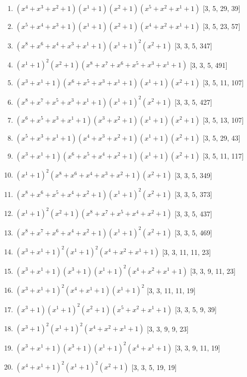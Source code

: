 \documentclass[10pt,twocolumn]{article}
\begin{document}
\begin{enumerate}
\item $(x^{4} + x^{3} + x^{2} + 1)(x^{1} + 1)(x^{2} + 1)(x^{5} + x^{2} + x^{1} + 1)$  [3, 5, 29, 39]
\item $(x^{5} + x^{4} + x^{3} + 1)(x^{1} + 1)(x^{2} + 1)(x^{4} + x^{2} + x^{1} + 1)$  [3, 5, 23, 57]
\item $(x^{8} + x^{6} + x^{4} + x^{3} + x^{1} + 1)(x^{1} + 1)^{2}(x^{2} + 1)$  [3, 3, 5, 347]
\item $(x^{1} + 1)^{2}(x^{2} + 1)(x^{8} + x^{7} + x^{6} + x^{5} + x^{3} + x^{1} + 1)$  [3, 3, 5, 491]
\item $(x^{3} + x^{1} + 1)(x^{6} + x^{5} + x^{3} + x^{1} + 1)(x^{1} + 1)(x^{2} + 1)$  [3, 5, 11, 107]
\item $(x^{8} + x^{7} + x^{5} + x^{3} + x^{1} + 1)(x^{1} + 1)^{2}(x^{2} + 1)$  [3, 3, 5, 427]
\item $(x^{6} + x^{5} + x^{3} + x^{1} + 1)(x^{3} + x^{2} + 1)(x^{1} + 1)(x^{2} + 1)$  [3, 5, 13, 107]
\item $(x^{5} + x^{3} + x^{1} + 1)(x^{4} + x^{3} + x^{2} + 1)(x^{1} + 1)(x^{2} + 1)$  [3, 5, 29, 43]
\item $(x^{3} + x^{1} + 1)(x^{6} + x^{5} + x^{4} + x^{2} + 1)(x^{1} + 1)(x^{2} + 1)$  [3, 5, 11, 117]
\item $(x^{1} + 1)^{2}(x^{8} + x^{6} + x^{4} + x^{3} + x^{2} + 1)(x^{2} + 1)$  [3, 3, 5, 349]
\item $(x^{8} + x^{6} + x^{5} + x^{4} + x^{2} + 1)(x^{1} + 1)^{2}(x^{2} + 1)$  [3, 3, 5, 373]
\item $(x^{1} + 1)^{2}(x^{2} + 1)(x^{8} + x^{7} + x^{5} + x^{4} + x^{2} + 1)$  [3, 3, 5, 437]
\item $(x^{8} + x^{7} + x^{6} + x^{4} + x^{2} + 1)(x^{1} + 1)^{2}(x^{2} + 1)$  [3, 3, 5, 469]
\item $(x^{3} + x^{1} + 1)^{2}(x^{1} + 1)^{2}(x^{4} + x^{2} + x^{1} + 1)$  [3, 3, 11, 11, 23]
\item $(x^{3} + x^{1} + 1)(x^{3} + 1)(x^{1} + 1)^{2}(x^{4} + x^{2} + x^{1} + 1)$  [3, 3, 9, 11, 23]
\item $(x^{3} + x^{1} + 1)^{2}(x^{4} + x^{1} + 1)(x^{1} + 1)^{2}$  [3, 3, 11, 11, 19]
\item $(x^{3} + 1)(x^{1} + 1)^{2}(x^{2} + 1)(x^{5} + x^{2} + x^{1} + 1)$  [3, 3, 5, 9, 39]
\item $(x^{3} + 1)^{2}(x^{1} + 1)^{2}(x^{4} + x^{2} + x^{1} + 1)$  [3, 3, 9, 9, 23]
\item $(x^{3} + x^{1} + 1)(x^{3} + 1)(x^{1} + 1)^{2}(x^{4} + x^{1} + 1)$  [3, 3, 9, 11, 19]
\item $(x^{4} + x^{1} + 1)^{2}(x^{1} + 1)^{2}(x^{2} + 1)$  [3, 3, 5, 19, 19]

\end{enumerate}
\end{document}
